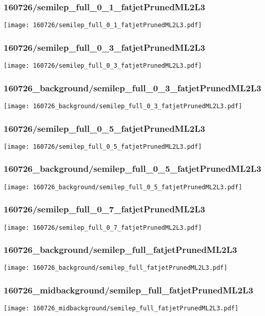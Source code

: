 \begin{frame}
   \frametitle{\small 160726/semilep\_full\_0\_1\_fatjetPrunedML2L3}
   \centering
   \texttt{[image: 160726/semilep\_full\_0\_1\_fatjetPrunedML2L3.pdf]}
\end{frame}

\begin{frame}
   \frametitle{\small 160726/semilep\_full\_0\_3\_fatjetPrunedML2L3}
   \centering
   \texttt{[image: 160726/semilep\_full\_0\_3\_fatjetPrunedML2L3.pdf]}
\end{frame}

\begin{frame}
   \frametitle{\small 160726\_background/semilep\_full\_0\_3\_fatjetPrunedML2L3}
   \centering
   \texttt{[image: 160726\_background/semilep\_full\_0\_3\_fatjetPrunedML2L3.pdf]}
\end{frame}

\begin{frame}
   \frametitle{\small 160726/semilep\_full\_0\_5\_fatjetPrunedML2L3}
   \centering
   \texttt{[image: 160726/semilep\_full\_0\_5\_fatjetPrunedML2L3.pdf]}
\end{frame}

\begin{frame}
   \frametitle{\small 160726\_background/semilep\_full\_0\_5\_fatjetPrunedML2L3}
   \centering
   \texttt{[image: 160726\_background/semilep\_full\_0\_5\_fatjetPrunedML2L3.pdf]}
\end{frame}

\begin{frame}
   \frametitle{\small 160726/semilep\_full\_0\_7\_fatjetPrunedML2L3}
   \centering
   \texttt{[image: 160726/semilep\_full\_0\_7\_fatjetPrunedML2L3.pdf]}
\end{frame}

\begin{frame}
   \frametitle{\small 160726\_background/semilep\_full\_fatjetPrunedML2L3}
   \centering
   \texttt{[image: 160726\_background/semilep\_full\_fatjetPrunedML2L3.pdf]}
\end{frame}

\begin{frame}
   \frametitle{\small 160726\_midbackground/semilep\_full\_fatjetPrunedML2L3}
   \centering
   \texttt{[image: 160726\_midbackground/semilep\_full\_fatjetPrunedML2L3.pdf]}
\end{frame}


